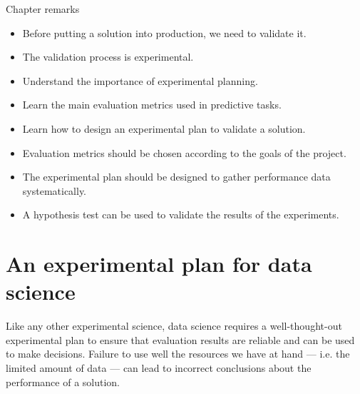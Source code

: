 \begin{mainbox}{Chapter remarks}


  \startcontents[chapters]
  \vspace{1em}


  \begin{itemize}
    \itemsep0em
    \item Before putting a solution into production, we need to validate it.
    \item The validation process is experimental.
  \end{itemize}


  \begin{itemize}
    \itemsep0em
    \item Understand the importance of experimental planning.
    \item Learn the main evaluation metrics used in predictive tasks.
    \item Learn how to design an experimental plan to validate a solution.
  \end{itemize}


  \begin{itemize}
    \itemsep0em
    \item Evaluation metrics should be chosen according to the goals of the project.
    \item The experimental plan should be designed to gather performance data
      systematically.
    \item A hypothesis test can be used to validate the results of the experiments.
  \end{itemize}
\end{mainbox}

{}
\clearpage



\section{An experimental plan for data science}

Like any other experimental science, data science requires a well-thought-out experimental
plan to ensure that evaluation results are reliable and can be used to make decisions.
Failure to use well the resources we have at hand --- i.e. the limited amount of data ---
can lead to incorrect conclusions about the performance of a solution.

